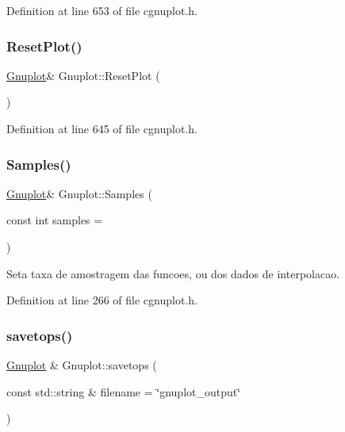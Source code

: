 Definition at line 653 of file cgnuplot.\+h.

\mbox{\label{class_gnuplot_a5180044de81d85bcd81aa7e9376eb9d1}} 
\subsubsection{\texorpdfstring{Reset\+Plot()}{ResetPlot()}}
{\footnotesize\ttfamily \hyperlink{class_gnuplot}{Gnuplot}\& Gnuplot\+::\+Reset\+Plot (\begin{DoxyParamCaption}{ }\end{DoxyParamCaption})\hspace{0.3cm}{\ttfamily [inline]}}



Definition at line 645 of file cgnuplot.\+h.

\mbox{\label{class_gnuplot_a0be7d1bfb41fd1e44969361ab02320b9}} 
\subsubsection{\texorpdfstring{Samples()}{Samples()}}
{\footnotesize\ttfamily \hyperlink{class_gnuplot}{Gnuplot}\& Gnuplot\+::\+Samples (\begin{DoxyParamCaption}\item[{const int}]{samples = {} }\end{DoxyParamCaption})\hspace{0.3cm}{\ttfamily [inline]}}



Seta taxa de amostragem das funcoes, ou dos dados de interpolacao. 



Definition at line 266 of file cgnuplot.\+h.

\mbox{\label{class_gnuplot_a032072c7c01b508a7535a17fb08562b1}} 
\subsubsection{\texorpdfstring{savetops()}{savetops()}}
{\footnotesize\ttfamily \hyperlink{class_gnuplot}{Gnuplot} \& Gnuplot\+::savetops (\begin{DoxyParamCaption}\item[{const std\+::string \&}]{filename = {\ttfamily \char`\"{}gnuplot\+\_\+output\char`\"{}} }\end{DoxyParamCaption})}



